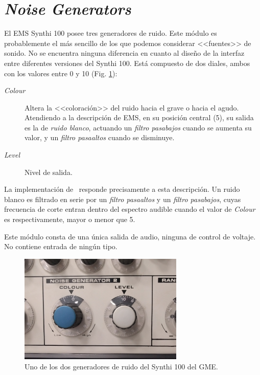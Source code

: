 \section{\textit{Noise Generators}}
\label{sec:noise_generators}

El EMS Synthi 100 posee tres generadores de ruido. Este módulo es probablemente el más sencillo de los que podemos considerar <<fuentes>> de sonido. No se encuentra ninguna diferencia en cuanto al diseño de la interfaz entre diferentes versiones del Synthi 100. Está compuesto de dos diales, ambos con los valores entre 0 y 10 (Fig. \ref{fig:noise_generator}):

\begin{description}
	\item[\textit{Colour}] Altera la <<coloración>> del ruido hacia el grave o hacia el agudo. Atendiendo a la descripción de EMS, en su posición central (5), su salida es la de \textit{ruido blanco}, actuando un \textit{filtro pasabajos} cuando se aumenta su valor, y un \textit{filtro pasaaltos} cuando se disminuye.
	\item[\textit{Level}] Nivel de salida.
\end{description}

La implementación de \appName~responde precisamente a esta descripción. Un ruido blanco es filtrado en serie por un \textit{filtro pasaaltos} y un \textit{filtro pasabajos}, cuyas frecuencia de corte entran dentro del espectro audible cuando el valor de \textit{Colour} es respectivamente, mayor o menor que 5.

Este módulo consta de una única salida de audio, ninguna de control de voltaje. No contiene entrada de ningún tipo.

\begin{figure}
	\centering
	\includegraphics[width=0.7\textwidth]{images/noise_generator}
	\caption{Uno de los dos generadores de ruido del Synthi 100 del GME.}
	\label{fig:noise_generator}
\end{figure}